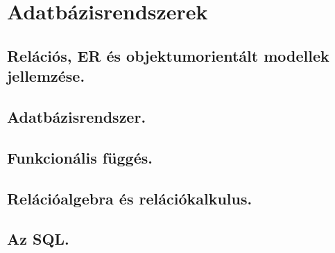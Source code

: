 \section{Adatbázisrendszerek}
\subsection{Relációs, ER és objektumorientált modellek jellemzése.}

\subsection{Adatbázisrendszer.}

\subsection{Funkcionális függés.}

\subsection{Relációalgebra és relációkalkulus. }

\subsection{Az SQL.}
